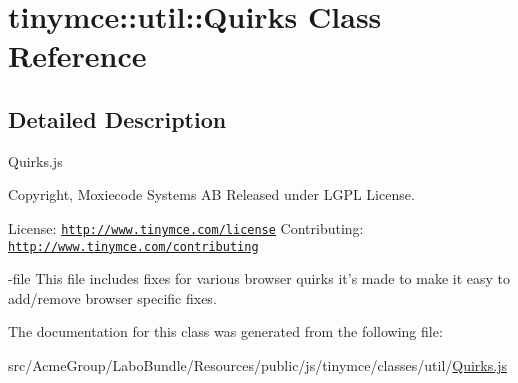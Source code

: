 \hypertarget{classtinymce_1_1util_1_1_quirks}{\section{tinymce\+:\+:util\+:\+:Quirks Class Reference}
\label{classtinymce_1_1util_1_1_quirks}
}


\subsection{Detailed Description}
Quirks.\+js

Copyright, Moxiecode Systems A\+B Released under L\+G\+P\+L License.

License\+: \href{http://www.tinymce.com/license}{\tt http\+://www.\+tinymce.\+com/license} Contributing\+: \href{http://www.tinymce.com/contributing}{\tt http\+://www.\+tinymce.\+com/contributing}

-\/file This file includes fixes for various browser quirks it's made to make it easy to add/remove browser specific fixes. 

The documentation for this class was generated from the following file\+:\begin{DoxyCompactItemize}
\item 
src/\+Acme\+Group/\+Labo\+Bundle/\+Resources/public/js/tinymce/classes/util/\hyperlink{classes_2util_2_quirks_8js}{Quirks.\+js}\end{DoxyCompactItemize}
